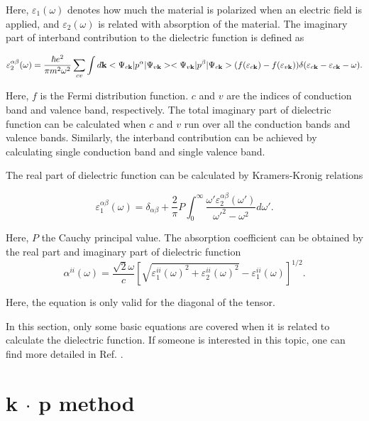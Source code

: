 \documentclass[a4paper, 12pt, titlepage,oneside,drop]{kthesis}
\begin{document}
Here, $\varepsilon_1(\omega)$ denotes how much the material is polarized when an electric field is applied, and $\varepsilon_2(\omega)$ is related with absorption of the material. The imaginary part of interband contribution to the dielectric function is defined as

\begin{equation}\label{df2}
\varepsilon_2^{\alpha\beta} (\omega)= \frac{\hbar e^2}{\pi m^2\omega^2} \sum_{cv} \int d \textbf {k} <\Psi_{c{\textbf k}}|p^\alpha|\Psi_{v{\textbf k}}><\Psi_{v{\textbf k}}|p^\beta|\Psi_{c{\textbf k}}> (f(\varepsilon_{c \textbf k})-f(\varepsilon_{v \textbf k}))\delta(\varepsilon_{c {\textbf k}}-\varepsilon_{c{\textbf k}}-\omega).
\end{equation}

Here, $f$ is the Fermi distribution function. $c$ and $v$ are the indices of conduction band and valence band, respectively. The total imaginary part of dielectric function can be calculated when $c$ and $v$ run over all the conduction bands and valence bands. Similarly, the
interband contribution can be achieved by calculating single conduction band and single valence band.   

The real part of dielectric function can be calculated by Kramers-Kronig relations

\begin{equation}
 \varepsilon_1^{\alpha\beta} (\omega)= \delta_{\alpha\beta}+\frac{2}{\pi}P\int^{\infty}_{0} \frac{\omega'\varepsilon_2^{\alpha\beta}(\omega')}{\omega'^{2}-\omega^{2}} d\omega'.
\end{equation}

Here, $P$ the Cauchy principal value. The absorption coefficient can be obtained by the real part and imaginary part of dielectric function
\begin{equation}
 \alpha^{ii}(\omega) = \frac{\sqrt{2}\omega}{c} \left[ \sqrt{{\varepsilon^{ii}_1(\omega)}^2+{\varepsilon^{ii}_2(\omega)}^2}-{\varepsilon^{ii}_1(\omega)} \right]^{1/2}.
\end{equation}

Here, the equation is only valid for the diagonal of the tensor.

In this section, only some basic equations are covered when it is related to calculate the dielectric function. If someone is interested in this topic, one can find more detailed in Ref. \cite{ambrosch2006linear}.


\section{k $\cdot$ p method}
\label{kpmaa}
\end{document}
